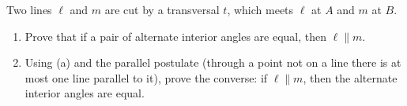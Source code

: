 Two lines $\ell$ and $m$ are cut by a transversal $t$, which meets $\ell$ at $A$ and $m$ at $B$.
\begin{enumerate}
\item[(a)] Prove that if a pair of alternate interior angles are equal, then $\ell\parallel m$.
\item[(b)] Using (a) and the parallel postulate (through a point not on a line there is at most one line parallel to it), prove the converse: if $\ell\parallel m$, then the alternate interior angles are equal.
\end{enumerate}
